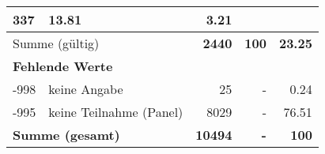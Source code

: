 \begin{longtable}{lXrrr}
       \num{337} &
       \num[round-mode=places,round-precision=2]{13.81} &
         \num[round-mode=places,round-precision=2]{3.21} \\
     \midrule
     \multicolumn{2}{l}{Summe (gültig)} &
       \textbf{\num{2440}} &
     \textbf{\num{100}} &
       \textbf{\num[round-mode=places,round-precision=2]{23.25}} \\
     \multicolumn{5}{l}{\textbf{Fehlende Werte}}\\
       -998 &
       keine Angabe &
         \num{25} &
        - &
         \num[round-mode=places,round-precision=2]{0.24} \\
       -995 &
       keine Teilnahme (Panel) &
         \num{8029} &
        - &
         \num[round-mode=places,round-precision=2]{76.51} \\
     \midrule
     \multicolumn{2}{l}{\textbf{Summe (gesamt)}} &
          \textbf{\num{10494}} &
        \textbf{-} &
        \textbf{\num{100}} \\
     \bottomrule
     \end{longtable}
     
